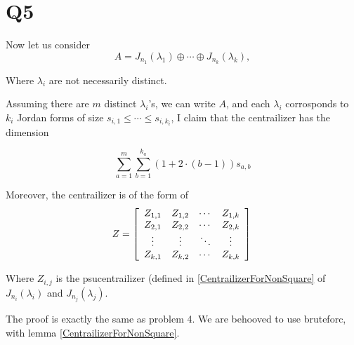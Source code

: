 \documentclass[12pt, a4paper]{article}
\theoremstyle{definition}
\theoremstyle{remark}
\begin{document}
\section{Q5}

Now let us consider $$A = J_{n_1}(\lambda_1)\oplus \cdots \oplus J_{n_k}(\lambda_k),$$

Where $\lambda_i$ are not necessarily distinct.

Assuming there are $m$ distinct $\lambda_i$'s, we can write $A$, and each $\lambda_i$ corrosponds to $k_i$ Jordan forms of size $s_{i,1} \leq \cdots \leq s_{i,k_i}$,
I claim that the centrailizer has the dimension

$$ \sum_{a=1}^{m} \sum_{b=1}^{k_a} (1+2 \cdot (b-1)) s_{a,b} $$

Moreover, the centrailizer is of the form of
\[
	Z =
	\left[
		\begin{array}{cccc}
			Z_{1,1} & Z_{1,2} & \cdots & Z_{1,k} \\
			Z_{2,1} & Z_{2,2} & \cdots & Z_{2,k} \\
			\vdots  & \vdots  & \ddots & \vdots  \\
			Z_{k,1} & Z_{k,2} & \cdots & Z_{k,k}
		\end{array}
		\right]  \\
\]

Where $Z_{i,j}$ is the psucentrailizer (defined in \ref{CentrailizerForNonSquare} of $J_{n_i}(\lambda_i)$ and $J_{n_j}(\lambda_j)$.

The proof is exactly the same as problem 4. We are behooved to use bruteforc, with lemma \ref{CentrailizerForNonSquare}.
\end{document}
